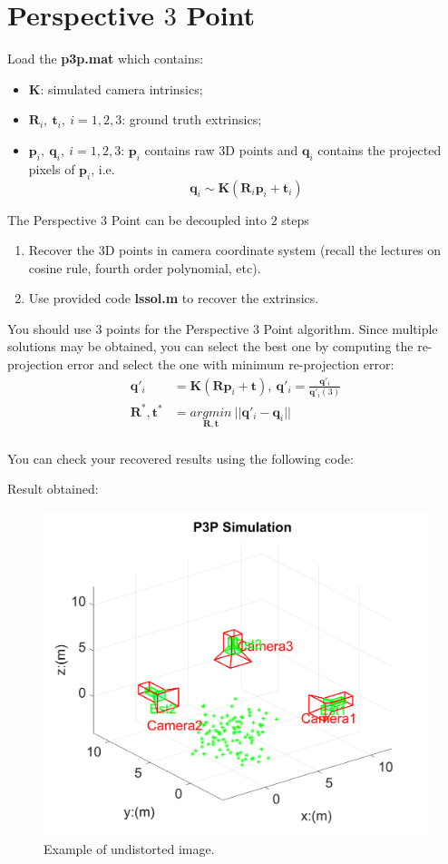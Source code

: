 \documentclass[a4paper]{article}
\begin{document}
\section{Perspective $3$ Point}
Load the \textbf{p3p.mat} which contains:
\begin{itemize}
\item $\mathbf{K}$: simulated camera intrinsics;
\item $\mathbf{R}_i,\ \mathbf{t}_i,\ i=1,2,3$: ground truth extrinsics;
\item $\mathbf{p}_i,\ \mathbf{q}_i,\ i=1,2,3$: $\mathbf{p}_i$ contains raw $3$D points and $\mathbf{q}_i$ contains the projected pixels of $\mathbf{p}_i$, i.e. $$\mathbf{q}_i \sim \mathbf{K}(\mathbf{R}_i\mathbf{p}_i+\mathbf{t}_i)$$
\end{itemize}
The Perspective $3$ Point can be decoupled into $2$ steps
\begin{enumerate}
\item Recover the $3$D points in camera coordinate system (recall the lectures on cosine rule, fourth order polynomial, etc).
\item Use provided code \textbf{lssol.m} to recover the extrinsics.
\end{enumerate}
You should use $3$ points for the Perspective $3$ Point algorithm. Since multiple solutions may be obtained, you can select the best one by computing the re-projection error and select the one with minimum re-projection error:
\begin{align*}
\mathbf{q}'_i&=\mathbf{K}(\mathbf{Rp}_i+\mathbf{t}),\ \mathbf{q}'_i= \frac{\mathbf{q}'_i}{\mathbf{q}'_i(3)} \\
\mathbf{R^*}, \mathbf{t^*}&=\underset{\mathbf{R}, \mathbf{t}}{argmin}\ ||\mathbf{q}'_i-\mathbf{q}_i||\\
\end{align*}

You can check your recovered results using the following code:

Result obtained:
\begin{figure}[!b]
\centering
\includegraphics[scale=0.4]{figures/p3p.png}
\caption{Example of undistorted image.}
\end{figure}
\end{document}
